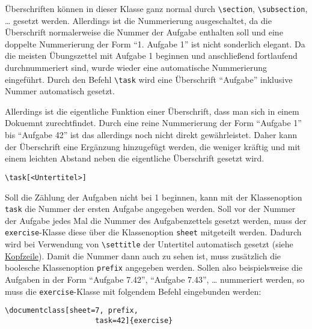 \documentclass{exercise}
\begin{document}
  \label{section-aufgaben}
    Überschriften können in dieser Klasse ganz normal durch \lstinline{\section}, \lstinline{\subsection}, \ldots{} gesetzt werden. Allerdings ist die Nummerierung ausgeschaltet, da die Überschrift normalerweise die Nummer der Aufgabe enthalten soll und eine doppelte Nummerierung der Form \enquote{1. Aufgabe 1} ist nicht sonderlich elegant. Da die meisten Übungszettel mit Aufgabe 1 beginnen und anschließend fortlaufend durchnummeriert sind, wurde wieder eine automatische Nummerierung eingeführt. Durch den Befehl \lstinline-\task- wird eine Überschrift \enquote{Aufgabe} inklusive Nummer automatisch gesetzt.
    
    Allerdings ist die eigentliche Funktion einer Überschrift, dass man sich in einem Dokuemnt zurechtfindet. Durch eine reine Nummerierung der Form \enquote{Aufgabe 1} bis \enquote{Aufgabe 42} ist das allerdings noch nicht direkt gewährleistet. Daher kann der Überschrift eine Ergänzung hinzugefügt werden, die weniger kräftig und mit einem leichten Abstand neben die eigentliche Überschrift gesetzt wird.
    \begin{lstlisting}[gobble=6]
      \task[<Untertitel>]
    \end{lstlisting}

    Soll die Zählung der Aufgaben nicht bei 1 beginnen, kann mit der Klassenoption \texttt{task} die Nummer der ersten Aufgabe angegeben werden. Soll vor der Nummer der Aufgabe jedes Mal die Nummer des Aufgabenzettels gesetzt werden, muss der \texttt{exercise}-Klasse diese über die Klassenoption \lstinline{sheet} mitgeteilt werden. Dadurch wird bei Verwendung von \lstinline-\settitle- der Untertitel automatisch gesetzt (siehe \hyperref[section-kopfzeile]{Kopfzeile}). Damit die Nummer dann auch zu sehen ist, muss zusätzlich die boolesche Klassenoption \lstinline{prefix} angegeben werden. Sollen also beispielsweise die Aufgaben in der Form \enquote{Aufgabe 7.42}, \enquote{Aufgabe 7.43}, \ldots{} nummeriert werden, so muss die \texttt{exercise}-Klasse mit folgendem Befehl eingebunden werden:
    \begin{lstlisting}[gobble=6]
      \documentclass[sheet=7, prefix,
                     task=42]{exercise}
    \end{lstlisting} 
\end{document}
